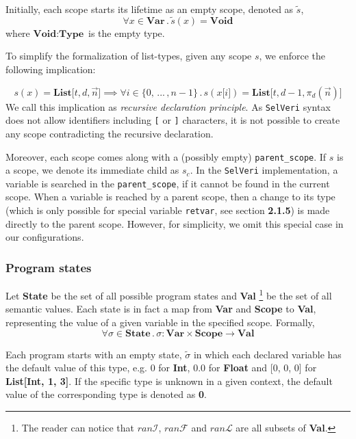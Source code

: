 \documentclass{article}
\begin{document}
Initially, each scope starts its lifetime as an empty scope, denoted as $\tilde{s}$, 
\[
\forall x \in \textbf{Var} \, . \,\tilde{s}(x) = \textbf{Void}
\]
where $\textbf{Void} : \textbf{Type}$ is the empty type.

To simplify the formalization of list-types, given any scope $s$, we enforce the following implication:

\[
s(x) = \textbf{List[$t,d,\vec{n}$]}
\implies
\forall i \in \{0, \,...\, , n-1\} \,.\, s(x\texttt{[$i$]}) = \textbf{List[$t, d-1, \pi_d(\vec{n})$]}
\]
We call this implication as \textit{recursive declaration principle}. As \texttt{SelVeri} syntax does not allow identifiers including \texttt{[} or \texttt{]} characters, it is not possible to create any scope contradicting the recursive declaration.

Moreover, each scope comes along with a (possibly empty) \texttt{parent\_scope}. If $s$ is a scope, we denote its immediate child as $s_c$. In the \texttt{SelVeri} implementation, a variable is searched in the \texttt{parent\_scope}, if it cannot be found in the current scope. When a variable is reached by a parent scope, then a change to its type (which is only possible for special variable \texttt{retvar}, see section \textbf{2.1.5}) is made directly to the parent scope. However, for simplicity, we omit this special case in our configurations.

\subsubsection{Program states}

Let \textbf{State} be the set of all possible program states and \textbf{Val} \footnote{The reader can notice that $ran\mathcal{I}$, $ran\mathcal{F}$ and $ran\mathcal{L}$ are all subsets of \textbf{Val}.} be the set of all semantic values. Each state is in fact a map from \textbf{Var} and \textbf{Scope} to \textbf{Val}, representing the value of a given variable in the specified scope. Formally,
\[
\forall \sigma \in \textbf{State} \, . \, \sigma: \textbf{Var} \times \textbf{Scope} \rightarrow \textbf{Val}
\]

Each program starts with an empty state, $\tilde{\sigma}$ in which each declared variable has the default value of this type, e.g. 0 for \textbf{Int}, 0.0 for \textbf{Float} and  [0, 0, 0] for \textbf{List[Int, 1, 3]}. If the specific type is unknown in a given context, the default value of the corresponding type is denoted as \textbf{0}.
\end{document}
